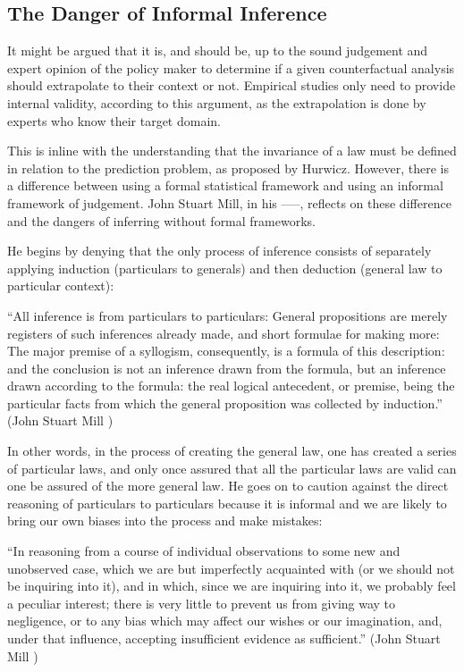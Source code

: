 \documentclass[a4paper,12pt]{article}
\begin{document}
\subsection*{The Danger of Informal Inference}

 
%

It might be argued that it is, and should be, up to the sound judgement and expert opinion of the policy maker to determine if a given counterfactual analysis should extrapolate to their context or not. Empirical studies only need to provide internal validity, according to this argument, as the extrapolation is done by experts who know their target domain. 

This is inline with the understanding that the invariance of a law must be defined in relation to the prediction problem, as proposed by Hurwicz. However, there is a difference between using a formal statistical framework and using an informal framework of judgement. John Stuart Mill, in his -----, reflects on these difference and the dangers of inferring without formal frameworks. 

He begins by denying that the only process of inference consists of separately applying induction (particulars to generals) and then deduction (general law to particular context):

\begin{displayquote}
  ``All inference is from particulars to particulars: General propositions are merely registers of such inferences already made, and short formulae for making more: The major premise of a syllogism, consequently, is a formula of this description: and the conclusion is not an inference drawn from the formula, but an inference drawn according to the formula: the real logical antecedent, or premise, being the particular facts from which the general proposition was collected by induction.''  (John Stuart Mill  )
\end{displayquote}

In other words, in the process of creating the general law, one has created a series of particular laws, and only once assured that all the particular laws are valid can one be assured of the more general law. He goes on to caution against the direct reasoning of particulars to particulars because it is informal and we are likely to bring our own biases into the process and make mistakes: 
%
\begin{displayquote}
``In reasoning from a course of individual observations to some new and unobserved case, which we are but imperfectly acquainted with (or we should not be inquiring into it), and in which, since we are inquiring into it, we probably feel a peculiar interest; there is very little to prevent us from giving way to negligence, or to any bias which may affect our wishes or our imagination, and, under that influence, accepting insufficient evidence as sufficient.'' (John Stuart Mill )  
\end{displayquote}
\end{document}
